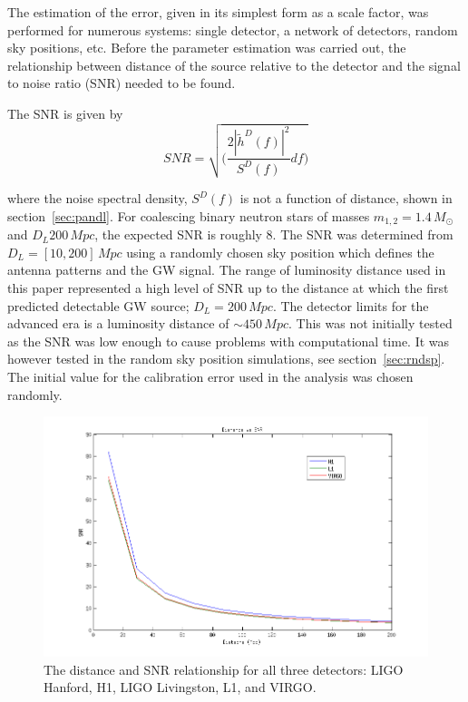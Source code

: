 \documentclass[12pt]{iopart}
\newcommand{\gws}{\tilde{h}}
\begin{document}
The estimation of the error, given in its simplest form as a scale factor, was
performed for numerous systems: single detector, a network of detectors, random
sky positions, etc. Before the parameter estimation was carried out, the
relationship between distance of the source relative to the detector and the
signal to noise ratio (SNR) needed to be found.

The SNR is given by
\begin{equation}
  \label{eq:snr}
  SNR = \sqrt{\Bigg( \frac{2 |\gws^D(f)|^2}{S^D(f)} df \Bigg)}
\end{equation}

where the noise spectral density, $S^D(f)$ is not a function of distance, shown
in section~\ref{sec:pandl}. For coalescing binary neutron stars of masses
$m_{1,2} = 1.4\,M_{\odot}$ and  $D_{L}200\,Mpc$, the expected SNR is roughly 8.
The SNR was determined from $D_{L} = [10,200]\,Mpc$  using a randomly chosen
sky position which defines the antenna patterns and the GW signal. The range of
luminosity distance used in this paper represented a high level of SNR up to
the distance at which the first predicted detectable GW source; $D_{L} =
200\,Mpc$. The detector limits for the advanced era is a luminosity distance of
$\sim 450\,Mpc$. This was not initially tested as the SNR was low enough to
cause problems with computational time. It was however tested in the random sky
position simulations, see section~\ref{sec:rndsp}. The initial value for the
calibration error used in the analysis was chosen randomly.

\begin{figure}
  \centering
  \includegraphics[width = \textwidth]{DvsSNR-mult-det}
  \caption{The distance and SNR relationship for all three detectors:
LIGO Hanford, H1, LIGO Livingston, L1, and VIRGO.}
  \label{fig:distsnr}
\end{figure}
\end{document}
